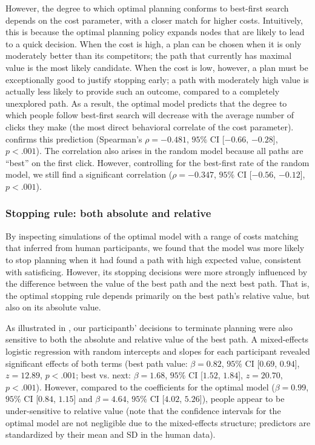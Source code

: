 However, the degree to which optimal planning conforms to best-first search depends on the cost parameter, with a closer match for higher costs.
Intuitively, this is because the optimal planning policy expands nodes that are likely to lead to a quick decision. When the cost is high, a plan can be chosen when it is only moderately better than its competitors; the path that currently has maximal value is the most likely candidate. When the cost is low, however, a plan must be exceptionally good to justify stopping early; a path with moderately high value is actually less likely to provide such an outcome, compared to a completely unexplored path.
As a result, the optimal model predicts that the degree to which people follow best-first search will decrease with the average number of clicks they make (the most direct behavioral correlate of the cost parameter).  confirms this prediction (Spearman's $\rho=-0.481$, $95\%$ CI [$-0.66$, $-0.28$], $p < .001$). The correlation also arises in the random model because all paths are ``best'' on the first click. However, controlling for the best-first rate of the random model, we still find a significant correlation ($\rho=-0.347$, $95\%$ CI [$-0.56$, $-0.12$], $p < .001$).

\subsubsection{Stopping rule: both absolute and relative}\label{sec:planning-stopping}
By inspecting simulations of the optimal model with a range of costs matching that inferred from human participants, we found that the model was more likely to stop planning when it had found a path with high expected value, consistent with satisficing. However, its stopping decisions were more strongly influenced by the difference between the value of the best path and the next best path. That is, the optimal stopping rule depends primarily on the best path's relative value, but also on its absolute value.

As illustrated in , our participantb' decisions to terminate planning were also sensitive to both the absolute and relative value of the best path. A mixed-effects logistic regression with random intercepts and slopes for each participant revealed significant effects of both terms (best path value: $\beta = 0.82$, $95\%$ CI [$0.69$, $0.94$], $z = 12.89$, $p < .001$; best vs. next: $\beta = 1.68$, $95\%$ CI [$1.52$, $1.84$], $z = 20.70$, $p < .001$). However, compared to the coefficients for the optimal model ($\beta = 0.99$, $95\%$ CI [$0.84$, $1.15$] and $\beta = 4.64$, $95\%$ CI [$4.02$, $5.26$]), people appear to be under-sensitive to relative value (note that the confidence intervals for the optimal model are not negligible due to the mixed-effects structure; predictors are standardized by their mean and SD in the human data).

